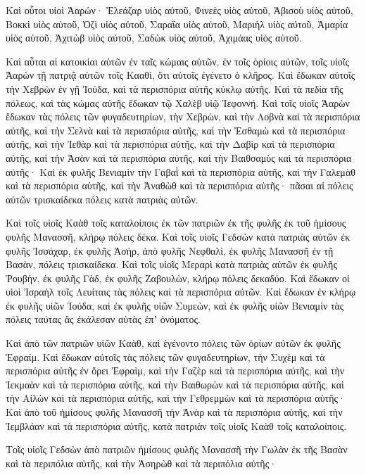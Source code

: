 {Καὶ οὗτοι υἱοὶ Ἀαρών· Ἐλεάζαρ υἱὸς αὐτοῦ, Φινεὲς υἱὸς αὐτοῦ, Ἀβισοὺ υἱὸς αὐτοῦ,
Βοκκὶ υἱὸς αὐτοῦ, Ὀζὶ υἱὸς αὐτοῦ, Σαραΐα υἱὸς αὐτοῦ,
Μαριὴλ υἱὸς αὐτοῦ, Ἀμαρία υἱὸς αὐτοῦ, Ἀχιτὼβ υἱὸς αὐτοῦ,
Σαδὼκ υἱὸς αὐτοῦ, Ἀχιμάας υἱὸς αὐτοῦ.
\par }{\PP {}Καὶ αὗται αἱ κατοικίαι αὐτῶν ἐν ταῖς κώμαις αὐτῶν, ἐν τοῖς ὁρίοις αὐτῶν, τοῖς υἱοῖς Ἀαρὼν τῇ πατριᾷ αὐτῶν τοῖς Κααθὶ, ὅτι αὐτοῖς ἐγένετο ὁ κλῆρος.
Καὶ ἔδωκαν αὐτοῖς τὴν Χεβρὼν ἐν γῇ Ἰούδα, καὶ τὰ περισπόρια αὐτῆς κύκλῳ αὐτῆς.
Καὶ τὰ πεδία τῆς πόλεως, καὶ τὰς κώμας αὐτῆς ἔδωκαν τῷ Χαλὲβ υἱῷ Ἰεφοννή.
Καὶ τοῖς υἱοῖς Ἀαρὼν ἔδωκαν τὰς πόλεις τῶν φυγαδευτηρίων, τὴν Χεβρὼν, καὶ τὴν Λοβνὰ καὶ τὰ περισπόρια αὐτῆς, καὶ τὴν Σελνὰ καὶ τὰ περισπόρια αὐτῆς, καὶ τὴν Ἐσθαμὼ καὶ τὰ περισπόρια αὐτῆς,
καὶ τὴν Ἰεθὰρ καὶ τὰ περισπόρια αὐτῆς, καὶ τὴν Δαβὶρ καὶ τὰ περισπόρια αὐτῆς,
καὶ τὴν Ἀσὰν καὶ τὰ περισπόρια αὐτῆς, καὶ τὴν Βαιθσαμὺς καὶ τὰ περισπόρια αὐτῆς·
Καὶ ἐκ φυλῆς Βενιαμὶν τὴν Γαβαῒ καὶ τὰ περισπόρια αὐτῆς, καὶ τὴν Γαλεμὰθ καὶ τὰ περισπόρια αὐτῆς, καὶ τὴν Ἀναθὼθ καὶ τὰ περισπόρια αὐτῆς· πᾶσαι αἱ πόλεις αὐτῶν τρισκαίδεκα πόλεις κατὰ πατριὰς αὐτῶν.
\par }{\PP {}Καὶ τοῖς υἱοῖς Καὰθ τοῖς καταλοίποις ἐκ τῶν πατριῶν ἐκ τῆς φυλῆς ἐκ τοῦ ἡμίσους φυλῆς Μανασσῆ, κλήρῳ πόλεις δέκα.
Καὶ τοῖς υἱοῖς Γεδσὼν κατὰ πατριὰς αὐτῶν ἐκ φυλῆς Ἰσσάχαρ, ἐκ φυλῆς Ἀσὴρ, ἀπὸ φυλῆς Νεφθαλὶ, ἐκ φυλῆς Μανασσῆ ἐν τῇ Βασὰν, πόλεις τρισκαίδεκα.
Καὶ τοῖς υἱοῖς Μεραρὶ κατὰ πατριὰς αὐτῶν ἐκ φυλῆς Ῥουβὴν, ἐκ φυλῆς Γὰδ, ἐκ φυλῆς Ζαβουλὼν, κλήρῳ πόλεις δεκαδύο.
Καὶ ἔδωκαν οἱ υἱοὶ Ἰσραὴλ τοῖς Λευίταις τὰς πόλεις καὶ τὰ περισπόρια αὐτῶν.
Καὶ ἔδωκαν ἐν κλήρῳ ἐκ φυλῆς υἱῶν Ἰούδα, καὶ ἐκ φυλῆς υἱῶν Συμεὼν, καὶ ἐκ φυλῆς υἱῶν Βενιαμὶν τὰς πόλεις ταύτας ἃς ἐκάλεσαν αὐτὰς ἐπʼ ὀνόματος.
\par }{\PP {}Καὶ ἀπὸ τῶν πατριῶν υἱῶν Καὰθ, καὶ ἐγένοντο πόλεις τῶν ὁρίων αὐτῶν ἐκ φυλῆς Ἐφραίμ.
Καὶ ἔδωκαν αὐτοῖς τὰς πόλεις τῶν φυγαδευτηρίων, τὴν Συχὲμ καὶ τὰ περισπόρια αὐτῆς ἐν ὄρει Ἐφραὶμ, καὶ τὴν Γαζὲρ καὶ τὰ περισπόρια αὐτῆς,
καὶ τὴν Ἰεκμαὰν καὶ τὰ περισπόρια αὐτῆς, καὶ τὴν Βαιθωρὼν καὶ τὰ περισπόρια αὐτῆς,
καὶ τὴν Αἰλὼν καὶ τὰ περισπόρια αὐτῆς, καὶ τὴν Γεθρεμμὼν καὶ τὰ περισπόρια αὐτῆς·
Καὶ ἀπὸ τοῦ ἡμίσους φυλῆς Μανασσῆ τὴν Ἀνὰρ καὶ τὰ περισπόρια αὐτῆς, καὶ τὴν Ἰεμβλάαν καὶ τὰ περισπόρια αὐτῆς, κατὰ πατριὰν τοῖς υἱοῖς Καὰθ τοῖς καταλοίποις.
\par }{\PP {}Τοῖς υἱοῖς Γεδσὼν ἀπὸ πατριῶν ἡμίσους φυλῆς Μανασσῆ τὴν Γωλὰν ἐκ τῆς Βασὰν καὶ τὰ περιπόλια αὐτῆς, καὶ τὴν Ἀσηρὼθ καὶ τὰ περιπόλια αὐτῆς·
}
